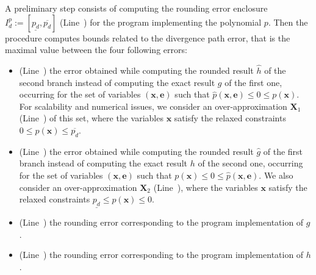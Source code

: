 \documentclass[preprint,fleqn,nocopyrightspace]{sigplanconf}
\newcommand{\x}{\mathbf{x}}
\newcommand{\e}{\mathbf{e}}
\def\X{\mathbf{X}}
\theoremstyle{plain}
\begin{document}
A preliminary step consists of computing the rounding error enclosure $I_d^p := [\underline{p_d}, \overline{p_d}]$ (Line~) for the program implementing the polynomial $p$. 
Then the procedure computes bounds related to the divergence path error, that is the maximal value between the four following errors: 
\begin{itemize}[noitemsep,nolistsep]
\item (Line~) the error obtained while computing the rounded result $\hat{h}$ of the second branch instead of computing the exact result $g$ of the first one, occurring for the set of variables $(\x,\e)$ such that $\hat{p}(\x,\e) \leq 0 \leq p(\x)$. For scalability and numerical issues, we consider an over-approximation $\X_1$ (Line~) of this set, where the variables $\x$ satisfy the relaxed constraints $0 \leq p(\x) \leq \overline{p_d}$.
\item (Line~) the error obtained while computing the rounded result $\hat{g}$ of the first branch instead of computing the exact result $h$ of the second one, occurring for the set of variables $(\x,\e)$ such that $p(\x) \leq 0 \leq \hat{p}(\x,\e)$. We also consider an over-approximation $\X_2$ (Line~), where the variables $\x$ satisfy the relaxed constraints $\underline{p_d} \leq p(\x) \leq 0$.
\item (Line~) the rounding error corresponding to the program implementation of $g$.
\item(Line~) the rounding error corresponding to the program implementation of $h$.
\end{itemize}
%
\end{document}
